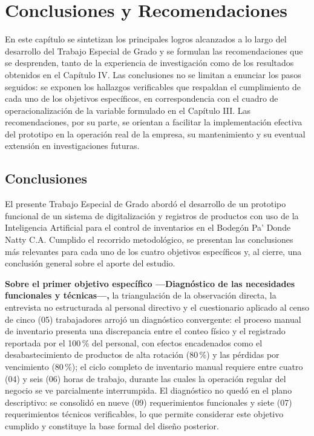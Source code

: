\documentclass[12pt, letterpaper]{report}
\begin{document}
\chapter{Conclusiones y Recomendaciones}

En este capítulo se sintetizan los principales logros alcanzados a lo
largo del desarrollo del Trabajo Especial de Grado y se formulan las
recomendaciones que se desprenden, tanto de la experiencia de
investigación como de los resultados obtenidos en el Capítulo IV. Las
conclusiones no se limitan a enunciar los pasos seguidos: se exponen
los hallazgos verificables que respaldan el cumplimiento de cada uno
de los objetivos específicos, en correspondencia con el cuadro de
operacionalización de la variable formulado en el Capítulo III. Las
recomendaciones, por su parte, se orientan a facilitar la
implementación efectiva del prototipo en la operación real de la
empresa, su mantenimiento y su eventual extensión en investigaciones
futuras.

\section{Conclusiones}

El presente Trabajo Especial de Grado abordó el desarrollo de un
prototipo funcional de un sistema de digitalización y registros de
productos con uso de la Inteligencia Artificial para el control de
inventarios en el Bodegón Pa' Donde Natty C.A. Cumplido el recorrido
metodológico, se presentan las conclusiones más relevantes para cada
uno de los cuatro objetivos específicos y, al cierre, una conclusión
general sobre el aporte del estudio.

\textbf{Sobre el primer objetivo específico ---Diagnóstico de las
necesidades funcionales y técnicas---,} la triangulación de la
observación directa, la entrevista no estructurada al personal
directivo y el cuestionario aplicado al censo de cinco (05)
trabajadores arrojó un diagnóstico convergente: el proceso manual de
inventario presenta una discrepancia entre el conteo físico y el
registrado reportada por el 100\,\% del personal, con efectos
encadenados como el desabastecimiento de productos de alta rotación
(80\,\%) y las pérdidas por vencimiento (80\,\%); el ciclo completo de
inventario manual requiere entre cuatro (04) y seis (06) horas de
trabajo, durante las cuales la operación regular del negocio se ve
parcialmente interrumpida. El diagnóstico no quedó en el plano
descriptivo: se consolidó en nueve (09) requerimientos funcionales y
siete (07) requerimientos técnicos verificables, lo que permite
considerar este objetivo cumplido y constituye la base formal del
diseño posterior.
\end{document}
